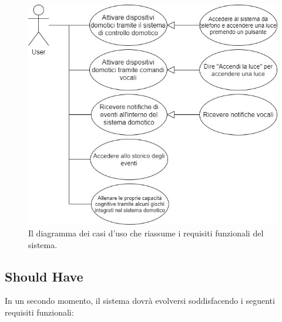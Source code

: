\begin{figure}[H]
  \centering
  \includegraphics[scale=0.5]{resources/images/analysis/use-cases-diagram.jpg}
  \caption{
    Il diagramma dei casi d'uso che riassume i requisiti funzionali del
    sistema.
  }
  \label{fig:figure2.1}
\end{figure}

\subsection{Should Have}
\label{subsec:Sezione2.1.2}

In un secondo momento, il sistema dovrà evolversi soddisfacendo i seguenti
requisiti funzionali:

